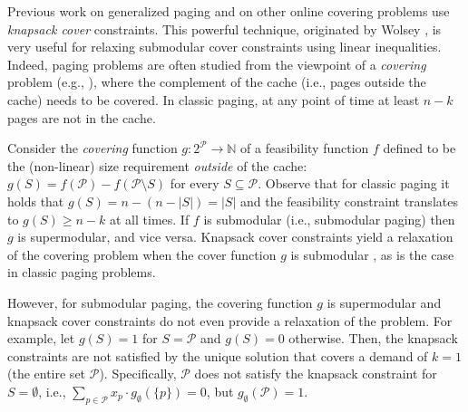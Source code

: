 \documentclass[11pt]{article}
\newcommand{\cP}{{\mathcal{P}}}
\begin{document}
Previous work on generalized paging \cite{bansal2012randomized,adamaszek2018log} and on other online covering problems \cite{gupta2020online,coester2022competitive} use  {\em knapsack cover} constraints. 
This powerful technique, originated by Wolsey \cite{wolsey1982analysis}, is very useful for relaxing submodular cover constraints
using linear inequalities. 
Indeed, paging problems are often studied from the viewpoint of a {\em covering} problem (e.g., \cite{bansal2012primal}), where the complement of the cache (i.e., pages outside the cache) needs to be covered. In classic paging, at any point of time at least $n-k$ pages are not in the cache. %

Consider the {\em covering} function $g:2^{\cP} \rightarrow \mathbb{N}$ of a feasibility function $f$ defined to be the (non-linear) size requirement {\em outside} of the cache: $g(S) = f(\cP)-f(\cP \setminus S)$ for every $S \subseteq \cP$. Observe that for classic paging it holds that $g(S) = n-(n-|S|) = |S|$ and the feasibility constraint translates to $g(S) \geq n-k$ at all times. If $f$ is submodular (i.e., submodular paging) then $g$ is supermodular, and vice versa. %
Knapsack cover constraints yield a relaxation of the covering problem when the cover function $g$ is submodular \cite{gupta2020online}, as is the case in classic paging problems.

However, for submodular paging, the covering function $g$ is supermodular and knapsack cover constraints do not even provide a relaxation of the problem.  For example, let $g(S) = 1$ for $S = \cP$ and $g(S) = 0$ otherwise. Then, the knapsack constraints are not satisfied by the unique solution that covers a demand of $k = 1$ (the entire set $\cP$). Specifically, $\cP$ does not satisfy the knapsack constraint for $S = \emptyset$, i.e.,  $\sum_{p \in \cP} x_p \cdot g_{\emptyset}(\{p\}) = 0$, but $g_{\emptyset}(\cP) = 1$. 
\end{document}
